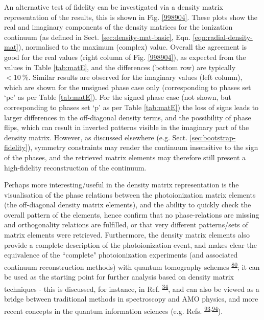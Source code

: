 \documentclass[10pt]{article}
\begin{document}
An alternative test of fidelity can be investigated via a density matrix representation of the results, this is shown in Fig. \ref{998904}. These plots show the real and imaginary components of the density matrices for the ionization continuum (as defined in Sect. \ref{sec:density-mat-basic}, Eqn. \ref{eqn:radial-density-mat}), normalised to the maximum (complex) value. Overall the agreement is good for the real values (right column of Fig. \ref{998904}), as expected from the values in Table \ref{tab:matE}, and the differences (bottom row) are typically $<10~\%$. Similar results are observed for the imaginary values (left column), which are shown for the unsigned phase case only (corresponding to phases set `pc' as per Table \ref{tab:matE}). For the signed phase case (not shown, but corresponding to phases set `p' as per Table \ref{tab:matE}) the loss of signs leads to larger differences in the off-diagonal density terms, and the possibility of phase flips, which 
can result in inverted patterns visible in the imaginary part of the density matrix. However, as discussed elsewhere (e.g. Sect. \ref{sec:bootstrap-fidelity}), symmetry constraints may render the continuum insensitive to the sign of the phases, and the retrieved matrix elements may therefore still present a high-fidelity reconstruction of the continuum.

Perhaps more interesting/useful in the density matrix representation is the visualisation of the phase relations between the photoionization matrix elements (the off-diagonal density matrix elements), and the ability to quickly check the overall pattern of the elements, hence confirm that no phase-relations are missing and orthogonality relations are fulfilled, or that very different patterns/sets of matrix elements were retrieved. Furthermore, the density matrix elements also provide a complete description of the photoionization event, and makes clear the equivalence of the ``complete" photoionization experiments (and associated continuum reconstruction methods) with quantum tomography schemes \textsuperscript{\hyperref[csl:80]{80}}; it can be used as the starting point for further analysis based on density matrix techniques - this is discussed, for instance, in Ref. \textsuperscript{\hyperref[csl:34]{34}}, and can also be viewed as a bridge between traditional methods in spectroscopy and AMO physics, and more recent concepts in the quantum information sciences (e.g. Refs.  \textsuperscript{\hyperref[csl:93]{93},\hyperref[csl:94]{94}}).
\end{document}
